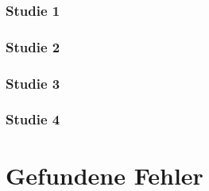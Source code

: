 \documentclass[parskip=full,11pt,twoside]{scrartcl}
\begin{document}

\subsubsection{Studie 1} %

\subsubsection{Studie 2} %

\subsubsection{Studie 3} %

\subsubsection{Studie 4} %

\section{Gefundene Fehler}
\end{document}
